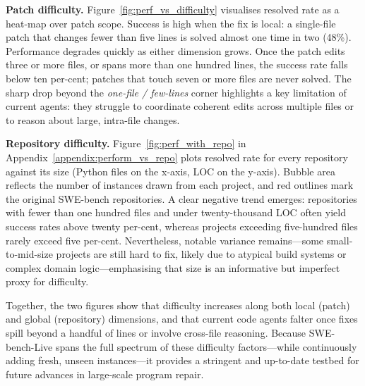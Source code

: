 \textbf{Patch difficulty.}  
Figure~\ref{fig:perf_vs_difficulty} visualises resolved rate as a heat-map over patch scope.  Success is high when the fix is local: a single-file patch that changes fewer than five lines is solved almost one time in two (48\%).  Performance degrades quickly as either dimension grows.  Once the patch edits three or more files, or spans more than one hundred lines, the success rate falls below ten per-cent; patches that touch seven or more files are never solved.  The sharp drop beyond the  \emph{one-file / few-lines} corner highlights a key limitation of current agents: they struggle to coordinate coherent edits across multiple files or to reason about large, intra-file changes.

\textbf{Repository difficulty.}  
Figure~\ref{fig:perf_with_repo} in Appendix~\ref{appendix:perform_vs_repo} plots resolved rate for every repository against its size (Python files on the x-axis, LOC on the y-axis).  Bubble area reflects the number of instances drawn from each project, and red outlines mark the original SWE-bench repositories.  A clear negative trend emerges: repositories with fewer than one hundred files and under twenty-thousand LOC often yield success rates above twenty per-cent, whereas projects exceeding five-hundred files rarely exceed five per-cent.  Nevertheless, notable variance remains—some small-to-mid-size projects are still hard to fix, likely due to atypical build systems or complex domain logic—emphasising that size is an informative but imperfect proxy for difficulty.

Together, the two figures show that difficulty increases along both local (patch) and global (repository) dimensions, and that current code agents falter once fixes spill beyond a handful of lines or involve cross-file reasoning.  Because SWE-bench-Live spans the full spectrum of these difficulty factors—while continuously adding fresh, unseen instances—it provides a stringent and up-to-date testbed for future advances in large-scale program repair.




